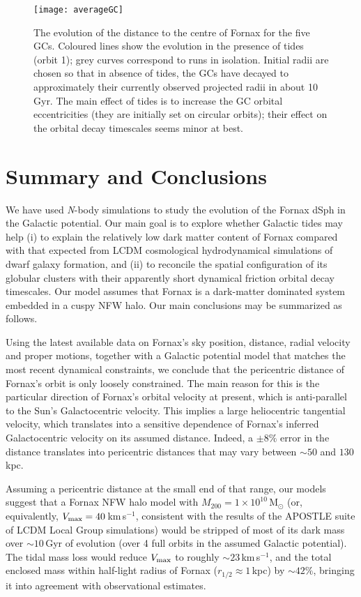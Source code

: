 \documentclass[fleqn,usenatbib]{mnras}
\begin{document}
\begin{figure*}
	\texttt{[image: averageGC]}
    \caption{The evolution of the distance to the centre of Fornax for the five GCs. Coloured lines show the evolution in the  presence of tides (orbit 1); grey curves correspond to runs in isolation. Initial radii are chosen so that in absence of tides, the GCs have decayed to approximately their currently observed projected radii in about 10\,Gyr. The main effect of tides is to increase the GC orbital eccentricities (they are initially set on circular orbits); their effect on the orbital decay timescales seems minor at best. }
    \label{fig:gc-t}
\end{figure*}

\section{Summary and Conclusions}
\label{sec:conclusions}

We have used \textit{N}-body simulations to study the evolution of the Fornax dSph in the Galactic potential. Our main goal is to explore whether Galactic tides may help (i) to explain the relatively low dark matter content of Fornax compared with that expected from LCDM cosmological hydrodynamical simulations of dwarf galaxy formation, and (ii) to reconcile the spatial configuration of its globular clusters with their apparently short dynamical friction orbital decay timescales. Our model assumes that Fornax is a dark-matter dominated system embedded in a cuspy NFW halo. Our main conclusions may be summarized as follows.

Using the latest available data on Fornax's sky position, distance, radial velocity and proper motions, together with a Galactic potential model that matches the most recent dynamical constraints, we conclude that the pericentric distance of Fornax's orbit is only loosely constrained. The main reason for this is the particular direction of Fornax's orbital velocity at present, which is anti-parallel to the Sun's Galactocentric velocity. This implies a large heliocentric tangential velocity, which translates into a sensitive dependence of Fornax's inferred Galactocentric velocity on its assumed distance. Indeed, a $\pm 8\%$ error in the distance translates into pericentric distances that may vary between $\sim 50$ and $130$\,kpc.

Assuming a pericentric distance at the small end of that range, our models suggest that a Fornax NFW halo model with $M_{200}=1\times 10^{10}$\,M$_\odot$ (or, equivalently, $V_{\rm max}=40$\,km\,s$^{-1}$, consistent with the results of the APOSTLE suite of LCDM Local Group simulations) would be stripped of most of its dark mass over $\sim 10$\,Gyr of evolution (over 4 full orbits in the assumed Galactic potential). The tidal mass loss would reduce $V_{\rm max}$ to roughly $\sim 23$\,km\,s$^{-1}$, and the total enclosed mass within half-light radius of Fornax ($r_{1/2}\approx 1$\,kpc) by $\sim 42\%$, bringing it into agreement with observational estimates. 
\end{document}
